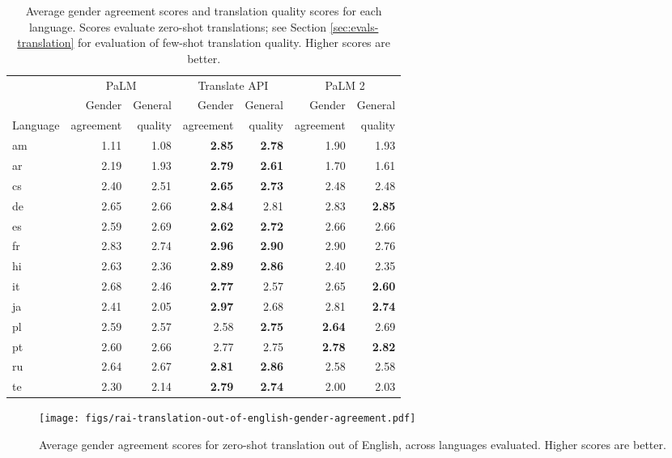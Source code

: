 \begin{table}[H]
\centering
\caption{Average gender agreement scores and translation quality scores for each language.  Scores evaluate zero-shot translations; see Section \ref{sec:evals-translation} for evaluation of few-shot translation quality.  Higher scores are better.}
\small
\begin{tabular}{lrrrrrr}
\toprule
     & \multicolumn{2}{c}{PaLM} & \multicolumn{2}{c}{Translate API} & \multicolumn{2}{c}{PaLM 2} \\
    & Gender & General & Gender & General & Gender & General \\
    Language & agreement & quality & agreement & quality & agreement & quality \\
    \midrule
    am & 1.11 & 1.08 & \textbf{2.85} &  \textbf{2.78} & 1.90 & 1.93 \\
    ar & 2.19 & 1.93 & \textbf{2.79} & \textbf{2.61} & 1.70 & 1.61 \\
    cs & 2.40 & 2.51 & \textbf{2.65} & \textbf{2.73} & 2.48 & 2.48 \\
    de & 2.65 & 2.66 & \textbf{2.84} & 2.81 & 2.83 & \textbf{2.85} \\
    es & 2.59 & 2.69 & \textbf{2.62} & \textbf{2.72} & 2.66 & 2.66 \\
    fr & 2.83 & 2.74 & \textbf{2.96} & \textbf{2.90} & 2.90 & 2.76 \\
    hi & 2.63 & 2.36 & \textbf{2.89} & \textbf{2.86} & 2.40 & 2.35 \\
    it & 2.68 & 2.46 & \textbf{2.77} & 2.57 & 2.65 & \textbf{2.60} \\
    ja & 2.41 & 2.05 & \textbf{2.97} & 2.68 & 2.81 & \textbf{2.74} \\
    pl & 2.59 & 2.57 & 2.58 & \textbf{2.75} & \textbf{2.64} & 2.69 \\
    pt & 2.60 & 2.66 & 2.77 & 2.75 & \textbf{2.78} & \textbf{2.82} \\
    ru & 2.64 & 2.67 & \textbf{2.81} & \textbf{2.86} & 2.58 & 2.58 \\
    te & 2.30 & 2.14 & \textbf{2.79} & \textbf{2.74} & 2.00 & 2.03 \\
    \bottomrule
\end{tabular}
\label{tab:rai-translation-gender-agreement}
\end{table}

\begin{figure}[H]
\centering
  \texttt{[image: figs/rai-translation-out-of-english-gender-agreement.pdf]}
  \caption{Average gender agreement scores for zero-shot translation out of English, across languages evaluated.  Higher scores are better.}
  \label{fig:rai-translate-gender-agreement}
\end{figure}

